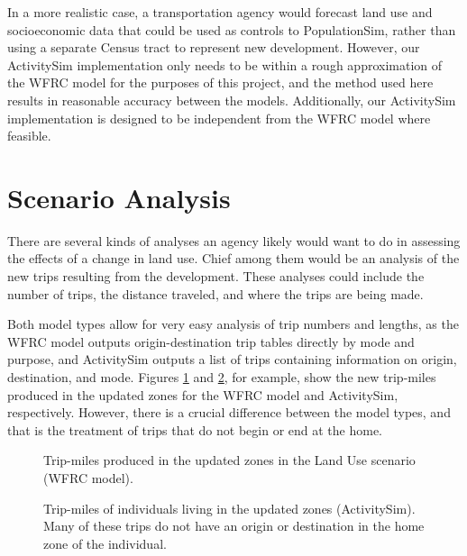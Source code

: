 \documentclass[fancy, twoside, mastersfancy, ms]{byuthesis}
\begin{document}
In a more realistic case, a transportation agency would forecast land
use and socioeconomic data that could be used as controls to
PopulationSim, rather than using a separate Census tract to represent
new development. However, our ActivitySim implementation only needs to
be within a rough approximation of the WFRC model for the purposes of
this project, and the method used here results in reasonable accuracy
between the models. Additionally, our ActivitySim implementation is
designed to be independent from the WFRC model where feasible.

\section{Scenario Analysis}\label{scenario-analysis}

There are several kinds of analyses an agency likely would want to do in
assessing the effects of a change in land use. Chief among them would be
an analysis of the new trips resulting from the development. These
analyses could include the number of trips, the distance traveled, and
where the trips are being made.

Both model types allow for very easy analysis of trip numbers and
lengths, as the WFRC model outputs origin-destination trip tables
directly by mode and purpose, and ActivitySim outputs a list of trips
containing information on origin, destination, and mode. Figures
\ref{fig-lu-personmiles-cube} and \ref{fig-lu-personmiles-asim}, for
example, show the new trip-miles produced in the updated zones for the
WFRC model and ActivitySim, respectively. However, there is a crucial
difference between the model types, and that is the treatment of trips
that do not begin or end at the home.

\begin{figure}


\caption{\label{fig-lu-personmiles-cube}Trip-miles produced in the
updated zones in the Land Use scenario (WFRC model).}

\end{figure}%

\begin{figure}


\caption[Trip-miles of individuals living in the updated zones
(ActivitySim).]{\label{fig-lu-personmiles-asim}Trip-miles of individuals
living in the updated zones (ActivitySim). Many of these trips do not
have an origin or destination in the home zone of the individual.}

\end{figure}%
\end{document}

